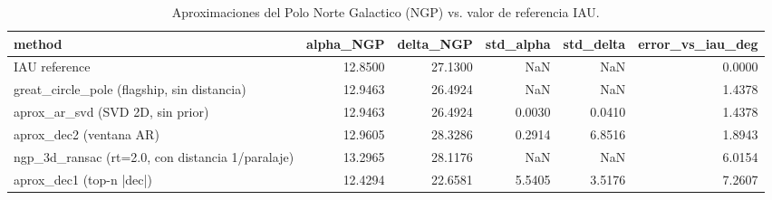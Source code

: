 \begin{table}[htbp]
\centering
\caption{Aproximaciones del Polo Norte Galactico (NGP) vs. valor de referencia IAU.}
\label{tab:ngp_comparison}
\begin{tabular}{lrrrrr}
\toprule
method & alpha_NGP & delta_NGP & std_alpha & std_delta & error_vs_iau_deg \\
\midrule
IAU reference & 12.8500 & 27.1300 & NaN & NaN & 0.0000 \\
great_circle_pole (flagship, sin distancia) & 12.9463 & 26.4924 & NaN & NaN & 1.4378 \\
aprox_ar_svd (SVD 2D, sin prior) & 12.9463 & 26.4924 & 0.0030 & 0.0410 & 1.4378 \\
aprox_dec2 (ventana AR) & 12.9605 & 28.3286 & 0.2914 & 6.8516 & 1.8943 \\
ngp_3d_ransac (rt=2.0, con distancia 1/paralaje) & 13.2965 & 28.1176 & NaN & NaN & 6.0154 \\
aprox_dec1 (top-n |dec|) & 12.4294 & 22.6581 & 5.5405 & 3.5176 & 7.2607 \\
\bottomrule
\end{tabular}
\end{table}
